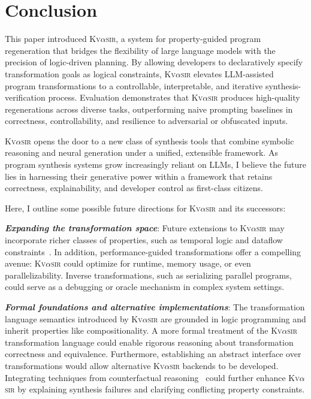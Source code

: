 \documentclass[nonacm,sigplan,review]{acmart}
\newcommand{\sys}{{\scshape Kv{$\alpha$}sir}\xspace}
\newcommand{\heading}[1]{\vspace{2pt}\noindent\textbf{\emph{#1}}:\enspace}
\begin{document}

\section{Conclusion}
This paper introduced \sys, a system for property-guided program regeneration
that bridges the flexibility of large language models with the precision of
logic-driven planning.
By allowing developers to declaratively specify
transformation goals as logical constraints, \sys elevates LLM-assisted program
transformations to a controllable, interpretable, and iterative synthesis-verification
process.
Evaluation demonstrates that \sys produces high-quality regenerations
across diverse tasks, outperforming naive prompting baselines in correctness,
controllability, and resilience to adversarial or obfuscated inputs.

\sys opens the door to a new class of synthesis tools that combine symbolic
reasoning and neural generation under a unified, extensible framework.
As program synthesis systems grow increasingly reliant on LLMs, I believe the
future lies in harnessing their generative power within a framework that retains
correctness, explainability, and developer control as first-class citizens.

Here, I outline some possible future directions for \sys and its successors:

\heading{Expanding the transformation space}
Future extensions to \sys may incorporate richer classes of properties, such as
temporal logic and dataflow
constraints~\cite{azzopardi2023ltl,handa2021orderawaredataflowmodelparallel}.
In addition, performance-guided transformations offer a compelling avenue: \sys
could optimize for runtime, memory usage, or even parallelizability.
Inverse
transformations, such as serializing parallel programs, could serve as
a debugging or oracle mechanism in complex system settings.

\heading{Formal foundations and alternative implementations}
The transformation language semantics introduced by \sys are grounded in logic
programming and inherit properties like compositionality.
A more formal treatment of the \sys
transformation language could enable rigorous reasoning about transformation
correctness and equivalence.
Furthermore, establishing an abstract interface
over transformations would allow alternative \sys backends to be developed.
Integrating techniques from
counterfactual reasoning~\cite{Cabalar_2020} could further enhance \sys by
explaining synthesis failures and clarifying conflicting property constraints.
\end{document}
